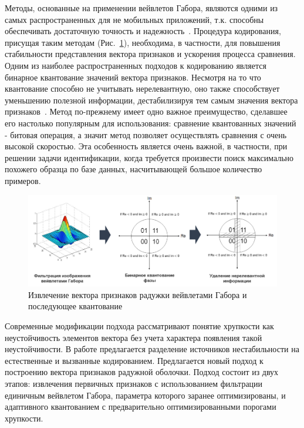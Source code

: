 Методы, основанные на применении вейвлетов Габора, являются одними из самых распространенных для не мобильных приложений, т.к. способны обеспечивать достаточную точность и надежность~\cite{daugman_how_works}. Процедура кодирования, присущая таким методам (Рис.~\ref{fig:fem-filter-and-quant}), необходима, в частности, для повышения стабильности представления вектора признаков и ускорения процесса сравнения. Одним из наиболее распространенных подходов к кодированию является бинарное квантование значений вектора признаков. Несмотря на то что квантование способно не учитывать нерелевантную, оно также способствует уменьшению полезной информации, дестабилизируя тем самым значения вектора признаков~\cite{hollingsworth_2009,proencca_2015}. Метод по-прежнему имеет одно важное преимущество, сделавшее его настолько популярным для использования: сравнение квантованных значений - битовая операция, а значит метод позволяет осуществлять сравнения с очень высокой скоростью. Эта особенность является очень важной, в частности, при решении задачи идентификации, когда требуется произвести поиск максимально похожего образца по базе данных, насчитывающей большое количество примеров.

\medspace
\begin{figure}[h]
	\begin{center}
		\includegraphics[width=0.95\columnwidth]{pictures/fem-filter-and-quant.png}
		\caption{Извлечение вектора признаков радужки вейвлетами Габора и последующее квантование}
		\label{fig:fem-filter-and-quant}
	\end{center}
\end{figure}

\noindent
Современные модификации подхода рассматривают понятие хрупкости как неустойчивость элементов вектора без учета характера появления такой неустойчивости. В работе предлагается разделение источников нестабильности на естественные и вызванные кодированием. Предлагается новый подход к построению вектора признаков радужной оболочки. Подход состоит из двух этапов: извлечения первичных признаков с использованием фильтрации единичным вейвлетом Габора, параметра которого заранее оптимизированы, и адаптивного квантованием с предварительно оптимизированными порогами хрупкости.

